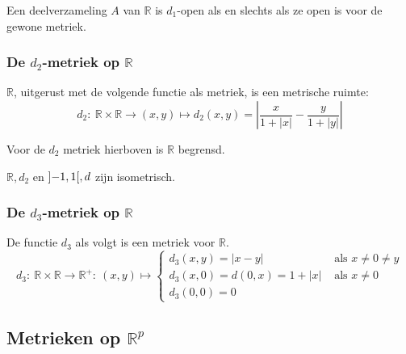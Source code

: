 \documentclass[main.tex]{subfiles}
\begin{document}
\begin{st}
  Een deelverzameling $A$ van $\mathbb{R}$ is $d_{1}$-open als en slechts als ze open is voor de gewone metriek.
\end{st}

\subsubsection{De $d_2$-metriek op $\mathbb{R}$}
\label{sec:d_2-metriek-op}

\begin{vb}
  $\mathbb{R}$, uitgerust met de volgende functie als metriek, is een metrische ruimte:
  \[ d_{2}:\ \mathbb{R}\times\mathbb{R}\rightarrow (x,y) \mapsto d_{2}(x,y)=\left| \frac{x}{1+|x|} - \frac{y}{1+|y|} \right| \]
\end{vb}

\begin{st}
  Voor de $d_{2}$ metriek hierboven is $\mathbb{R}$ begrensd.
\end{st}


\begin{vb}
  $\mathbb{R},d_{2}$ en $\interval[open]{-1}{1},d$ zijn isometrisch.
\end{vb}

\subsubsection{De $d_3$-metriek op $\mathbb{R}$}
\label{sec:d_3-metriek-op}

\begin{vb}
  De functie $d_{3}$ als volgt is een metriek voor $\mathbb{R}$.
  \[
  d_{3}:\ \mathbb{R} \times \mathbb{R} \rightarrow \mathbb{R}^{+}:\ (x,y) \mapsto
  \begin{cases}
    d_{3}(x,y) = |x-y| &\text{ als } x\neq 0 \neq y\\
    d_{3}(x,0) = d(0,x) = 1 + |x| &\text{ als } x \neq 0\\
    d_{3}(0,0) = 0
  \end{cases}
  \]
\end{vb}


\subsection{Metrieken op $\mathbb{R}^p$}
\label{sec:metr-op-mathbbrp}
\end{document}

